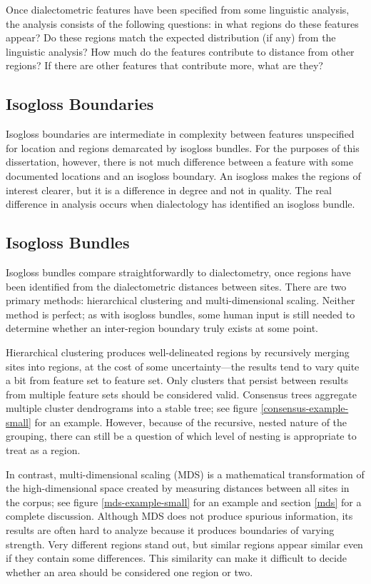 Once dialectometric features have been specified from some linguistic
analysis, the analysis consists of the following questions: in what
regions do these features appear? Do these regions match the expected
distribution (if any) from the linguistic analysis? How much do
the features contribute to distance from other regions? If there are
other features that contribute more, what are they?

\subsection{Isogloss Boundaries}

Isogloss boundaries are intermediate in complexity between features unspecified
for location and regions demarcated by isogloss bundles. For the
purposes of this dissertation, however, there is not much difference
between a feature with some documented locations and an isogloss
boundary. An isogloss makes the regions of interest clearer, but it is
a difference in degree and not in quality. The real difference in
analysis occurs when dialectology has identified an isogloss bundle.

\subsection{Isogloss Bundles}

Isogloss bundles compare straightforwardly to dialectometry, once
regions have been identified from the dialectometric distances between
sites. There are two primary methods: hierarchical clustering and
multi-dimensional scaling. Neither method is perfect; as with isogloss
bundles, some human input is still needed to determine whether an
inter-region boundary truly exists at some point.

Hierarchical clustering produces well-delineated regions by
recursively merging sites into regions, at the cost of some
uncertainty---the results tend to vary quite a bit from feature set to
feature set. Only clusters that persist between results from multiple
feature sets should be considered valid. Consensus trees aggregate
multiple cluster dendrograms into a stable tree; see figure
\ref{consensus-example-small} for an example. However, because of
the recursive, nested nature of the grouping, there can still be a
question of which level of nesting is appropriate to treat as
a region.

In contrast, multi-dimensional scaling (MDS) is a mathematical
transformation of the high-dimensional space created by measuring
distances between all sites in the corpus; see figure
\ref{mds-example-small} for an example and section \ref{mds} for a
complete discussion. Although MDS does not produce
spurious information, its results are often hard to analyze because it
produces boundaries of varying strength. Very different regions stand
out, but similar regions appear similar even if they contain some
differences. This similarity can make it difficult to decide whether
an area should be considered one region or two.

